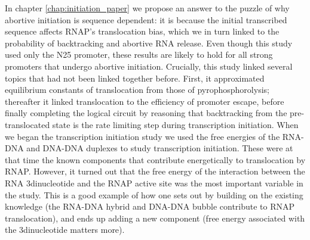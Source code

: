 In chapter \ref{chap:initiation_paper} we propose an answer to the puzzle of
why abortive initiation is sequence dependent: it is because the initial
transcribed sequence affects RNAP's translocation bias, which we in turn
linked to the probability of backtracking and abortive RNA release. Even
though this study used only the N25 promoter, these results are likely to hold
for all strong promoters that undergo abortive initiation. Crucially, this
study linked several topics that had not been linked together before. First,
it approximated equilibrium constants of translocation from those of
pyrophosphorolysis; thereafter it linked translocation to the efficiency of
promoter escape, before finally completing the logical circuit by reasoning
that backtracking from the pre-translocated state is the rate limiting step
during transcription initiation. When we began the transcription initiation
study we used the free energies of the RNA-DNA and DNA-DNA duplexes to study
transcription initiation.  These were at that time the known components that
contribute energetically to translocation by RNAP. However, it turned out that
the free energy of the interaction between the RNA 3\ppp dinucleotide and the
RNAP active site was the most important variable in the study. This is a good
example of how one sets out by building on the existing knowledge (the RNA-DNA
hybrid and DNA-DNA bubble contribute to RNAP translocation), and ends up
adding a new component (free energy associated with the 3\ppp dinucleotide
matters more).

